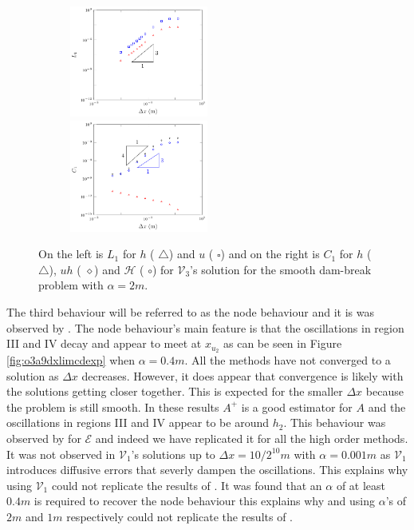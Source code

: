 \documentclass[SingleSpace,12pt,Journal]{Serre_ASCE}
\begin{document}
\begin{figure}
	\centering
\begin{subfigure}{\textwidth}
	\includegraphics[width=0.5\textwidth]{pics/results/SDB/Lcon/alpha0.5/1.pdf}
	\includegraphics[width=0.5\textwidth]{pics/results/SDB/Con/6.pdf}
\end{subfigure}
	\caption{On the left is $L_1$ for $h$ ({\color{red} $\triangle$}) and $u$ ({\color{blue} $\square$}) and on the right is $C_1$ for $h$ ({\color{red} $\triangle$}), $uh$ ({\color{black} $\diamond$}) and $\mathcal{H}$ ({\color{blue} $\circ$}) for $\mathcal{V}_3$'s solution for the smooth dam-break problem with $\alpha = 2m$.}
	\label{fig:o3a2dxlimmeasure}
\end{figure}

The third behaviour will be referred to as the node behaviour and it is was observed by . The node behaviour's main feature is that the oscillations in region III and IV decay and appear to meet at $x_{u_2}$ as can be seen in Figure \ref{fig:o3a9dxlimcdexp} when $\alpha = 0.4m$. All the methods have not converged to a solution as $\Delta x$ decreases. However, it does appear that convergence is likely with the solutions getting closer together. This is expected for the smaller $\Delta x$ because the problem is still smooth. In these results $A^+$ is a good estimator for $A$ and the oscillations in regions III and IV appear to be around $h_2$. This behaviour was observed by  for $\mathcal{E}$ and indeed we have replicated it for all the high order methods. It was not observed in $\mathcal{V}_1$'s solutions up to $\Delta x=10/2^{10}m$ with $\alpha=0.001m$ as $\mathcal{V}_1$ introduces diffusive errors that severly dampen the oscillations. This explains why  using $\mathcal{V}_1$ could not replicate the results of . It was found that an $\alpha$ of at least $0.4m$ is required to recover the node behaviour this explains why  and  using $\alpha$'s of $2m$ and $1m$ respectively could not replicate the results of . 
\end{document}
